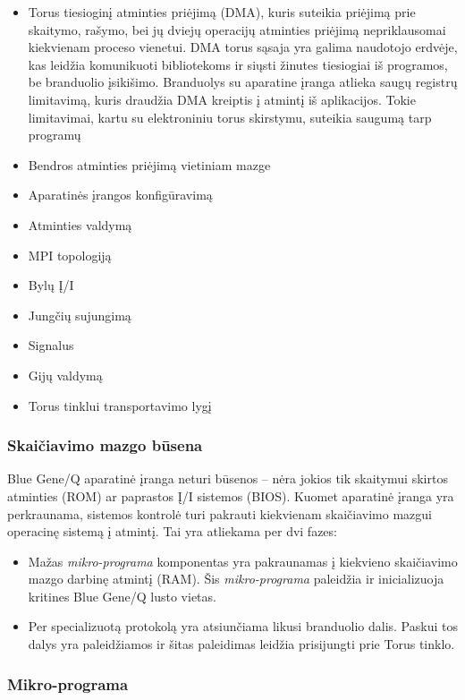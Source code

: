 \begin{itemize}
    \item Torus tiesioginį atminties priėjimą (DMA), kuris suteikia priėjimą prie skaitymo, rašymo, bei jų dviejų operacijų atminties priėjimą nepriklausomai kiekvienam proceso vienetui. DMA torus sąsaja yra galima naudotojo erdvėje, kas leidžia komunikuoti bibliotekoms ir siųsti žinutes tiesiogiai iš programos, be branduolio įsikišimo. Branduolys su aparatine įranga atlieka saugų registrų limitavimą, kuris draudžia DMA kreiptis į atmintį iš aplikacijos. Tokie limitavimai, kartu su elektroniniu torus skirstymu, suteikia saugumą tarp programų
    \item Bendros atminties priėjimą vietiniam mazge
    \item Aparatinės įrangos konfigūravimą
    \item Atminties valdymą
    \item MPI topologiją
    \item Bylų Į/I
    \item Jungčių sujungimą
    \item Signalus
    \item Gijų valdymą
    \item Torus tinklui transportavimo lygį 
\end{itemize}

\subsubsection{Skaičiavimo mazgo būsena}

Blue Gene/Q aparatinė įranga neturi būsenos -- nėra jokios tik skaitymui skirtos atminties (ROM) ar paprastos Į/I sistemos (BIOS).
Kuomet aparatinė įranga yra perkraunama, sistemos kontrolė turi pakrauti kiekvienam skaičiavimo mazgui operacinę sistemą į atmintį.
Tai yra atliekama per dvi fazes:

\begin{itemize}
    \item Mažas \textit{mikro-programa} komponentas yra pakraunamas į kiekvieno skaičiavimo mazgo darbinę atmintį (RAM). Šis \textit{mikro-programa} paleidžia ir inicializuoja kritines Blue Gene/Q lusto vietas.
    \item Per specializuotą protokolą yra atsiunčiama likusi branduolio dalis. Paskui tos dalys yra paleidžiamos ir šitas paleidimas leidžia prisijungti prie Torus tinklo.
\end{itemize}

\subsubsection{Mikro-programa}

